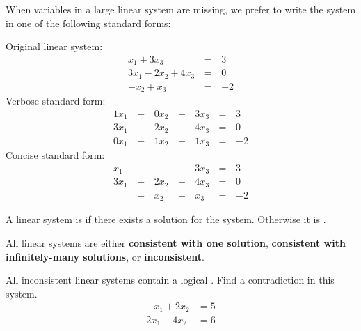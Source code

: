 \begin{applicationActivities}{1}{3}
\begin{remark}
  When variables in a large linear system are missing, we prefer to
  write the system in one of the following standard forms:

  \begin{multicols}{3}\noindent
    Original linear system:
    \begin{alignat*}{2}
       x_1 + 3x_3 &\,=\,& 3 \\
      3x_1 - 2x_2 + 4x_3 &\,=\,& 0 \\
      -x_2 +  x_3 &\,=\,& -2
    \end{alignat*}
    Verbose standard form:
    \begin{alignat*}{4}
      1x_1 &\,+\,& 0x_2 &\,+\,& 3x_3 &\,=\,& 3 \\
      3x_1 &\,-\,& 2x_2 &\,+\,& 4x_3 &\,=\,& 0 \\
      0x_1 &\,-\,& 1x_2 &\,+\,& 1x_3 &\,=\,& -2
    \end{alignat*}
    Concise standard form:
    \begin{alignat*}{4}
       x_1 &     &      &\,+\,& 3x_3 &\,=\,& 3 \\
      3x_1 &\,-\,& 2x_2 &\,+\,& 4x_3 &\,=\,& 0 \\
           &\,-\,&  x_2 &\,+\,&  x_3 &\,=\,& -2
    \end{alignat*}
  \end{multicols}
\end{remark}

\begin{definition}
  A linear system is  if there exists a solution for the
  system. Otherwise it is .
\end{definition}

\begin{fact}
  All linear systems are either \textbf{consistent with one solution},
  \textbf{consistent with infinitely-many solutions}, or
  \textbf{inconsistent}.
\end{fact}

\begin{activity}{10}
  All inconsistent linear systems contain a logical .
  Find a contradiction in this system.
  \begin{align*}
  -x_1+2x_2  &=  5 \\
  2x_1-4x_2  &=  6
  \end{align*}
\end{activity}


\end{applicationActivities}
